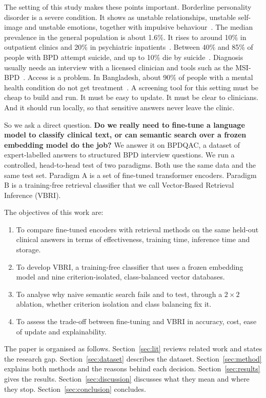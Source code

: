 \documentclass[11pt]{article}
\newcommand{\vbri}{VBRI}
\newcommand{\bpdqac}{BPDQAC}
\begin{document}
The setting of this study makes these points important. Borderline personality disorder is a severe
condition. It shows as unstable relationships, unstable self-image and unstable emotions, together
with impulsive behaviour~\cite{dsm}. The median prevalence in the general population is about 1.6\%.
It rises to around 10\% in outpatient clinics and 20\% in psychiatric inpatients~\cite{dsm}. Between
40\% and 85\% of people with BPD attempt suicide, and up to 10\% die by
suicide~\cite{paris2001,stone1990,oumaya2008}. Diagnosis usually needs an interview with a licensed
clinician and tools such as the MSI-BPD~\cite{zanarini2003}. Access is a problem. In Bangladesh,
about 90\% of people with a mental health condition do not get treatment~\cite{huque2025}. A
screening tool for this setting must be cheap to build and run. It must be easy to update. It must
be clear to clinicians. And it should run locally, so that sensitive answers never leave the clinic.

So we ask a direct question. \textbf{Do we really need to fine-tune a language model to classify
clinical text, or can semantic search over a frozen embedding model do the job?} We answer it on
\bpdqac{}, a dataset of expert-labelled answers to structured BPD interview questions. We run a
controlled, head-to-head test of two paradigms. Both use the same data and the same test set.
Paradigm A is a set of fine-tuned transformer encoders. Paradigm B is a training-free retrieval
classifier that we call Vector-Based Retrieval Inference (\vbri{}).

The objectives of this work are:
\begin{enumerate}[leftmargin=*,itemsep=2pt]
  \item To compare fine-tuned encoders with retrieval methods on the same held-out clinical answers
        in terms of effectiveness, training time, inference time and storage.
  \item To develop \vbri{}, a training-free classifier that uses a frozen embedding model and nine
        criterion-isolated, class-balanced vector databases.
  \item To analyse why naive semantic search fails and to test, through a $2\times2$ ablation,
        whether criterion isolation and class balancing fix it.
  \item To assess the trade-off between fine-tuning and \vbri{} in accuracy, cost, ease of update
        and explainability.
\end{enumerate}

The paper is organised as follows. Section~\ref{sec:lit} reviews related work and states the
research gap. Section~\ref{sec:dataset} describes the dataset. Section~\ref{sec:method} explains
both methods and the reasons behind each decision. Section~\ref{sec:results} gives the results.
Section~\ref{sec:discussion} discusses what they mean and where they stop. Section~\ref{sec:conclusion}
concludes.
\end{document}

